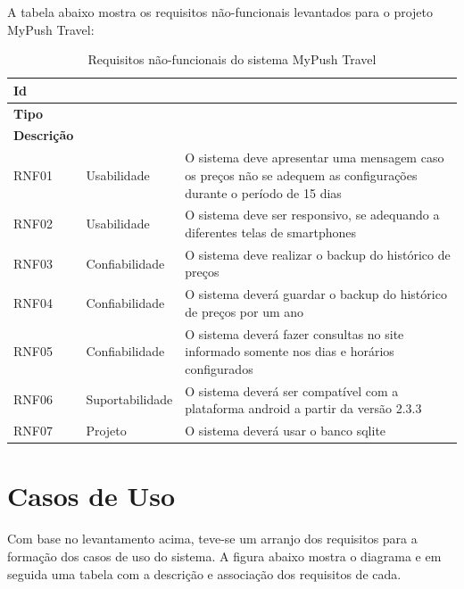 A tabela abaixo mostra os requisitos não-funcionais levantados para o projeto MyPush Travel:

\begin{table}[H]
	\centering
	\begin{tabular}{lll}
		\toprule
			\textbf{Id} & \\ \hline
			\textbf{Tipo} & \\ \hline
			\textbf{Descrição} \\ \hline
		\midrule
			RNF01 & Usabilidade & O sistema deve apresentar uma mensagem caso os preços não se adequem as configurações durante o período de 15 dias \\ \hline
			RNF02 & Usabilidade & O sistema deve ser responsivo, se adequando a diferentes telas de smartphones \\ \hline
			RNF03 & Confiabilidade & O sistema deve realizar o backup do histórico de preços \\ \hline
			RNF04 & Confiabilidade & O sistema deverá guardar o backup do histórico de preços por um ano \\ \hline
			RNF05 & Confiabilidade & O sistema deverá fazer consultas no site informado somente nos dias e horários configurados \\ \hline
			RNF06 & Suportabilidade & O sistema deverá ser compatível com a plataforma android a partir da versão 2.3.3 \\ \hline
			RNF07 & Projeto & O sistema deverá usar o banco sqlite \\ \hline
		\bottomrule
	\end{tabular}
	\caption{Requisitos não-funcionais do sistema MyPush Travel}
	\label{tab02}
\end{table}

\section{Casos de Uso}

Com base no levantamento acima, teve-se um arranjo dos requisitos para a formação dos casos de uso do sistema. A figura abaixo mostra o diagrama e em seguida uma tabela com a descrição e associação dos requisitos de cada.

